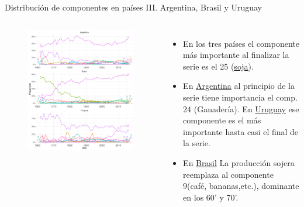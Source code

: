 \documentclass[compress]{beamer}
\begin{document}
\begin{frame}
\small
Distribución de componentes en países III. Argentina, Brasil y Uruguay
\scriptsize
\begin{columns}[c] 
	
	\begin{figure}
		\includegraphics[width=\linewidth]{graficoLDA_k30_ARG_BRA_URY}
	\end{figure}
	
	
	\begin{itemize}[label=\faRebel]
		\item En los tres países el componente más importante al finalizar la serie es el 25 (\underline{soja}).
		\item En \underline{Argentina} al principio de la serie tiene importancia el comp. 24 (Ganadería). En \underline{Uruguay} ese componente es el más importante hasta casi el final de la serie.
		\item En \underline{Brasil} La producción sojera reemplaza al componente 9(café, bananas,etc.), dominante en los 60' y 70'.
	\end{itemize}
	
\end{columns} 

\end{frame}
\end{document}
